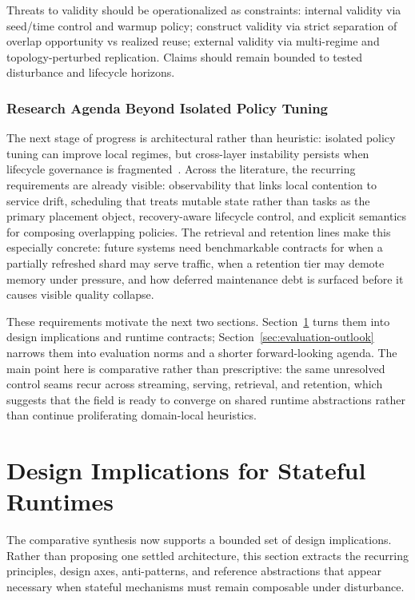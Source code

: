\documentclass[acmsmall,screen,review]{acmart}
\begin{document}
Threats to validity should be operationalized as constraints: internal validity via seed/time control and warmup policy; construct validity via strict separation of overlap opportunity vs realized reuse; external validity via multi-regime and topology-perturbed replication. Claims should remain bounded to tested disturbance and lifecycle horizons.

\subsubsection{Research Agenda Beyond Isolated Policy Tuning}

The next stage of progress is architectural rather than heuristic: isolated policy tuning can improve local regimes, but cross-layer instability persists when lifecycle governance is fragmented~\cite{zhang2019briskstream,mao2023morphstream,kwon2023pagedattention,agrawal2024sarathi}. Across the literature, the recurring requirements are already visible: observability that links local contention to service drift, scheduling that treats mutable state rather than tasks as the primary placement object, recovery-aware lifecycle control, and explicit semantics for composing overlapping policies. The retrieval and retention lines make this especially concrete: future systems need benchmarkable contracts for when a partially refreshed shard may serve traffic, when a retention tier may demote memory under pressure, and how deferred maintenance debt is surfaced before it causes visible quality collapse.

These requirements motivate the next two sections. Section~\ref{sec:design-implications} turns them into design implications and runtime contracts; Section~\ref{sec:evaluation-outlook} narrows them into evaluation norms and a shorter forward-looking agenda. The main point here is comparative rather than prescriptive: the same unresolved control seams recur across streaming, serving, retrieval, and retention, which suggests that the field is ready to converge on shared runtime abstractions rather than continue proliferating domain-local heuristics.

\section{Design Implications for Stateful Runtimes}
\label{sec:design-implications}

The comparative synthesis now supports a bounded set of design implications. Rather than proposing one settled architecture, this section extracts the recurring principles, design axes, anti-patterns, and reference abstractions that appear necessary when stateful mechanisms must remain composable under disturbance.
\end{document}
